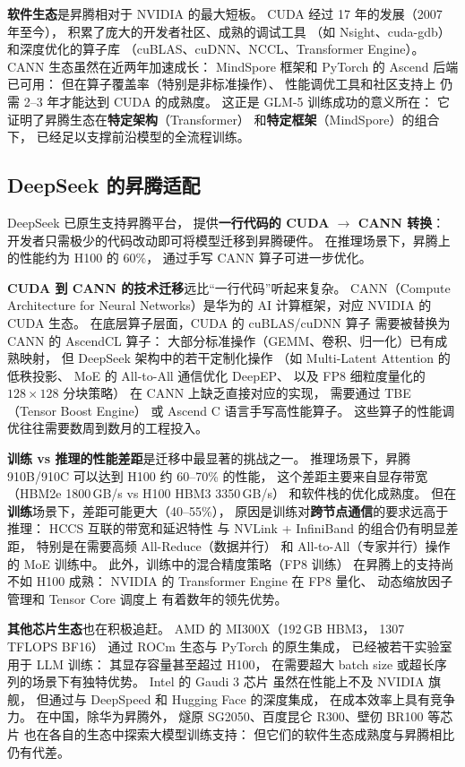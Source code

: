 \textbf{软件生态}是昇腾相对于 NVIDIA 的最大短板。
CUDA 经过 17 年的发展（2007 年至今），
积累了庞大的开发者社区、成熟的调试工具
（如 Nsight、cuda-gdb）和深度优化的算子库
（cuBLAS、cuDNN、NCCL、Transformer Engine）。
CANN 生态虽然在近两年加速成长：
MindSpore 框架和 PyTorch 的 Ascend 后端已可用：
但在算子覆盖率（特别是非标准操作）、
性能调优工具和社区支持上
仍需 2--3 年才能达到 CUDA 的成熟度。
这正是 GLM-5 训练成功的意义所在：
它证明了昇腾生态在\textbf{特定架构}（Transformer）
和\textbf{特定框架}（MindSpore）的组合下，
已经足以支撑前沿模型的全流程训练。

\subsection{DeepSeek 的昇腾适配}

DeepSeek 已原生支持昇腾平台，
提供\textbf{一行代码的 CUDA $\to$ CANN 转换}：
开发者只需极少的代码改动即可将模型迁移到昇腾硬件。
在推理场景下，昇腾上的性能约为 H100 的 60\%，
通过手写 CANN 算子可进一步优化。

\textbf{CUDA 到 CANN 的技术迁移}远比“一行代码”听起来复杂。
CANN（Compute Architecture for Neural Networks）是华为的
AI 计算框架，对应 NVIDIA 的 CUDA 生态。
在底层算子层面，CUDA 的 cuBLAS/cuDNN 算子
需要被替换为 CANN 的 AscendCL 算子：
大部分标准操作（GEMM、卷积、归一化）已有成熟映射，
但 DeepSeek 架构中的若干定制化操作
（如 Multi-Latent Attention 的低秩投影、
MoE 的 All-to-All 通信优化 DeepEP、
以及 FP8 细粒度量化的 $128 \times 128$ 分块策略）
在 CANN 上缺乏直接对应的实现，
需要通过 TBE（Tensor Boost Engine）
或 Ascend C 语言手写高性能算子。
这些算子的性能调优往往需要数周到数月的工程投入。

\textbf{训练 vs 推理的性能差距}是迁移中最显著的挑战之一。
推理场景下，昇腾 910B/910C 可以达到 H100 约 60--70\% 的性能，
这个差距主要来自显存带宽
（HBM2e 1800\,GB/s vs H100 HBM3 3350\,GB/s）
和软件栈的优化成熟度。
但在\textbf{训练}场景下，差距可能更大（40--55\%），
原因是训练对\textbf{跨节点通信}的要求远高于推理：
HCCS 互联的带宽和延迟特性
与 NVLink + InfiniBand 的组合仍有明显差距，
特别是在需要高频 All-Reduce（数据并行）
和 All-to-All（专家并行）操作的 MoE 训练中。
此外，训练中的混合精度策略（FP8 训练）
在昇腾上的支持尚不如 H100 成熟：
NVIDIA 的 Transformer Engine 在 FP8 量化、
动态缩放因子管理和 Tensor Core 调度上
有着数年的领先优势。

\textbf{其他芯片生态}也在积极追赶。
AMD 的 MI300X（192\,GB HBM3，
1307 TFLOPS BF16）
通过 ROCm 生态与 PyTorch 的原生集成，
已经被若干实验室用于 LLM 训练：
其显存容量甚至超过 H100，
在需要超大 batch size 或超长序列的场景下有独特优势。
Intel 的 Gaudi 3 芯片
虽然在性能上不及 NVIDIA 旗舰，
但通过与 DeepSpeed 和 Hugging Face 的深度集成，
在成本效率上具有竞争力。
在中国，除华为昇腾外，
燧原 SG2050、百度昆仑 R300、壁仞 BR100 等芯片
也在各自的生态中探索大模型训练支持：
但它们的软件生态成熟度与昇腾相比仍有代差。


